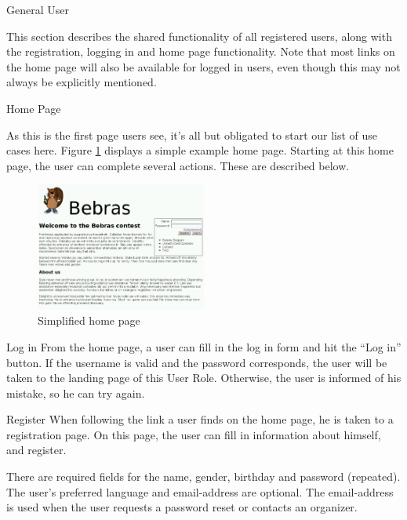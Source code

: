 
\begin{section}{General User}

    This section describes the shared functionality of all registered users,
    along with the registration, logging in and home page functionality. Note
    that most links on the home page will also be available for logged in users,
    even though this may not always be explicitly mentioned.

    \begin{subsection}{Home Page}

        As this is the first page users see, it's all but obligated to start our
        list of use cases here. Figure \ref{img:index} displays a simple example
        home page. Starting at this home page, the user can complete several
        actions. These are described below.

        \begin{figure}[b]
            \centering
            \includegraphics[width=0.5\textwidth]{img/index.png}
            \caption{Simplified home page}
            \label{img:index}
        \end{figure}

        \begin{subsubsection}{Log in}
            From the home page, a user can fill in the log in form and hit the
            ``Log in'' button. If the username is valid and the password
            corresponds, the user will be taken to the landing page of this User
            Role. Otherwise, the user is informed of his mistake, so he can try
            again.
        \end{subsubsection}

        \begin{subsubsection}{Register}
            When following the link a user finds on the home page, he is taken
            to a registration page. On this page, the user can fill in
            information about himself, and register.

            There are required fields for the name, gender, birthday and
            password (repeated). The user's preferred language and
            email-address are optional. The email-address is used when the user
            requests a password reset or contacts an organizer.


\end{subsubsection}
\end{subsection}
\end{section}
